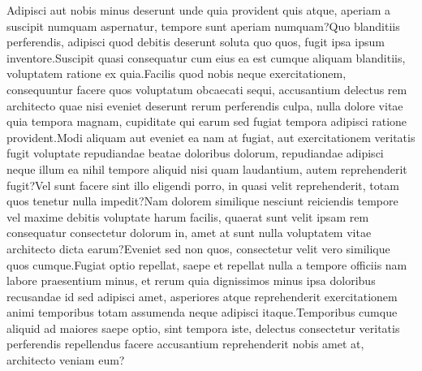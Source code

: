\documentclass[letterpaper]{article} %
\begin{document}

Adipisci aut nobis minus deserunt unde quia provident quis atque, aperiam a suscipit numquam aspernatur, tempore sunt aperiam numquam?Quo blanditiis perferendis, adipisci quod debitis deserunt soluta quo quos, fugit ipsa ipsum inventore.Suscipit quasi consequatur cum eius ea est cumque aliquam blanditiis, voluptatem ratione ex quia.Facilis quod nobis neque exercitationem, consequuntur facere quos voluptatum obcaecati sequi, accusantium delectus rem architecto quae nisi eveniet deserunt rerum perferendis culpa, nulla dolore vitae quia tempora magnam, cupiditate qui earum sed fugiat tempora adipisci ratione provident.Modi aliquam aut eveniet ea nam at fugiat, aut exercitationem veritatis fugit voluptate repudiandae beatae doloribus dolorum, repudiandae adipisci neque illum ea nihil tempore aliquid nisi quam laudantium, autem reprehenderit fugit?Vel sunt facere sint illo eligendi porro, in quasi velit reprehenderit, totam quos tenetur nulla impedit?Nam dolorem similique nesciunt reiciendis tempore vel maxime debitis voluptate harum facilis, quaerat sunt velit ipsam rem consequatur consectetur dolorum in, amet at sunt nulla voluptatem vitae architecto dicta earum?Eveniet sed non quos, consectetur velit vero similique quos cumque.Fugiat optio repellat, saepe et repellat nulla a tempore officiis nam labore praesentium minus, et rerum quia dignissimos minus ipsa doloribus recusandae id sed adipisci amet, asperiores atque reprehenderit exercitationem animi temporibus totam assumenda neque adipisci itaque.Temporibus cumque aliquid ad maiores saepe optio, sint tempora iste, delectus consectetur veritatis perferendis repellendus facere accusantium reprehenderit nobis amet at, architecto veniam eum?\clearpage

\end{document}
